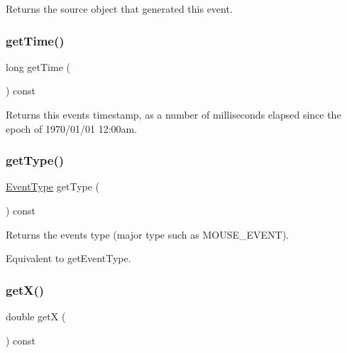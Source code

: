 Returns the source object that generated this event. 

\mbox{\label{classsgl_1_1GEvent_a33358fd133be1650e22dbe230748b417}} 
\subsubsection{\texorpdfstring{get\+Time()}{getTime()}}
{\footnotesize\ttfamily long get\+Time (\begin{DoxyParamCaption}{ }\end{DoxyParamCaption}) const\hspace{0.3cm}{\ttfamily [virtual]}}



Returns this event\textquotesingle{}s timestamp, as a number of milliseconds elapsed since the epoch of 1970/01/01 12\+:00am. 

\mbox{\label{classsgl_1_1GEvent_adfcd587f82f4340eaef5404f2cf6795c}} 
\subsubsection{\texorpdfstring{get\+Type()}{getType()}}
{\footnotesize\ttfamily \mbox{\hyperlink{namespacesgl_a2628ea8d12e8b2563c32f05dc7fff6fa}{Event\+Type}} get\+Type (\begin{DoxyParamCaption}{ }\end{DoxyParamCaption}) const\hspace{0.3cm}{\ttfamily [virtual]}}



Returns the event\textquotesingle{}s type (major type such as M\+O\+U\+S\+E\+\_\+\+E\+V\+E\+NT). 

Equivalent to get\+Event\+Type. \mbox{\label{classsgl_1_1GEvent_a344385751bee0720059403940d57a13e}} 
\subsubsection{\texorpdfstring{get\+X()}{getX()}}
{\footnotesize\ttfamily double getX (\begin{DoxyParamCaption}{ }\end{DoxyParamCaption}) const\hspace{0.3cm}{\ttfamily [virtual]}}



